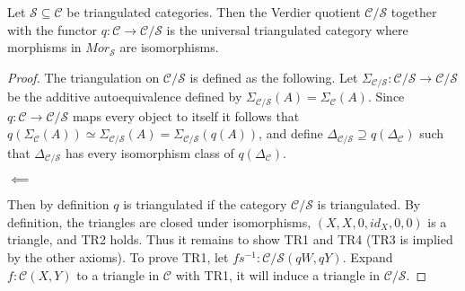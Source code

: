     \begin{theorem}
        Let $\mathcal{S}\subseteq\mathcal{C}$ be triangulated categories. Then the Verdier quotient $\mathcal{C}/\mathcal{S}$ together with the functor $q:\mathcal{C}\rightarrow\mathcal{C}/\mathcal{S}$ is the universal triangulated category where morphisms in $Mor_\mathcal{S}$ are isomorphisms.
    \end{theorem}

    \begin{proof}
        The triangulation on $\mathcal{C}/\mathcal{S}$ is defined as the following. Let $\Sigma_{\mathcal{C/S}}:\mathcal{C}/\mathcal{S}\rightarrow\mathcal{C}/\mathcal{S}$ be the additive autoequivalence defined by  $\Sigma_{\mathcal{C/S}}(A)=\Sigma_{\mathcal{C}}(A)$. Since $q:\mathcal{C}\rightarrow\mathcal{C}/\mathcal{S}$ maps every object to itself it follows that $q(\Sigma_{\mathcal{C}}(A)) \simeq \Sigma_{\mathcal{C/S}}(A) = \Sigma_{\mathcal{C/S}}(q(A))$, and define $\Delta_{\mathcal{C}/\mathcal{S}}\supseteq q(\Delta_\mathcal{C})$ such that $\Delta_{\mathcal{C}/\mathcal{S}}$ has every isomorphism class of $q(\Delta_\mathcal{C})$. 
        \begin{center}
            $\impliedby$
        \end{center}
        Then by definition $q$ is triangulated if the category $\mathcal{C}/\mathcal{S}$ is triangulated.
        By definition, the triangles are closed under isomorphisms, $(X,X,0,id_X,0,0)$ is a triangle, and TR2 holds. Thus it remains to show TR1 and TR4 (TR3 is implied by the other axioms). To prove TR1, let $fs^{-1}:\mathcal{C}/\mathcal{S}(qW,qY)$. Expand $f:\mathcal{C}(X,Y)$ to a triangle in $\mathcal{C}$ with TR1, it will induce a triangle in  $\mathcal{C}/\mathcal{S}$.

\end{proof}
